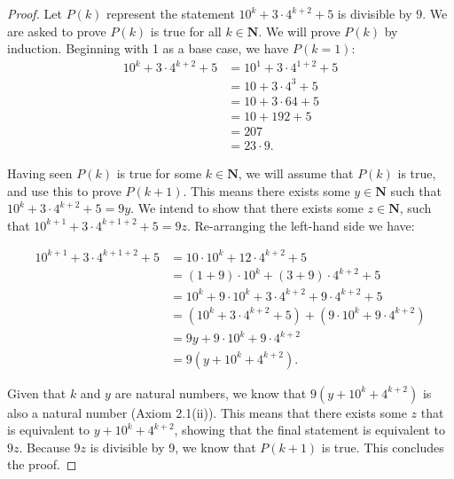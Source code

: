 \documentclass[12pt,oneside]{amsart}
\theoremstyle{remark}
\newcommand{\bfN}{\mathbf{N}}
\begin{document}
\begin{proof}
Let $P(k)$ represent the statement $10^k + 3 \cdot 4^{k + 2} + 5$ is divisible by $9$. We are asked to prove $P(k)$ is true for all $k \in \bfN$.  We will prove $P(k)$ by induction. Beginning with 1 as a base case, we have $P(k = 1)$:
\begin{align*}
10^k + 3 \cdot 4^{k+2} + 5 &= 10^1 + 3 \cdot 4^{1 + 2} + 5 \\
                           &= 10 + 3 \cdot 4^3 + 5 \\
                           &= 10 + 3 \cdot 64 + 5 \\
                           &= 10 + 192 + 5 \\
                           &= 207 \\
                           &= 23 \cdot 9.
\end{align*}

Having seen $P(k)$ is true for some $k \in \bfN$, we will assume that $P(k)$ is true, and use this to prove $P(k + 1)$. This means there exists some $y \in \bfN$ such that $10^k + 3 \cdot 4^{k + 2} + 5 = 9y$. We intend to show that there exists some $z \in \bfN$, such that $10^{k + 1} + 3 \cdot 4^{k + 1 + 2} + 5 = 9z$. Re-arranging the left-hand side we have:

\begin{align*}
10^{k + 1} + 3 \cdot 4^{k + 1 + 2} + 5
              &= 10 \cdot 10^k + 12 \cdot 4^{k + 2} + 5 \\
              &= (1 + 9) \cdot 10^k + (3 + 9) \cdot 4^{k + 2} + 5 \\
              &= 10^k + 9 \cdot 10^k + 3 \cdot 4^{k + 2} + 9 \cdot 4^{k + 2} + 5 \\
              &= (10^k + 3 \cdot 4^{k + 2} + 5) + (9 \cdot 10^k + 9 \cdot 4^{k  + 2}) \\
              &= 9y + 9 \cdot 10^k + 9 \cdot 4^{k  + 2} \\
              &= 9(y + 10^k + 4^{k + 2}).
\end{align*}

Given that $k$ and $y$ are natural numbers, we know that $9(y + 10^k + 4^{k + 2})$ is also a natural number (Axiom 2.1(ii)). This means that there exists some $z$ that is equivalent to $y + 10^k + 4^{k + 2}$, showing that the final statement is equivalent to $9z$. Because $9z$ is divisible by 9, we know that $P(k + 1)$ is true. This concludes the proof.
\end{proof}

%
%
%
%
\end{document}
